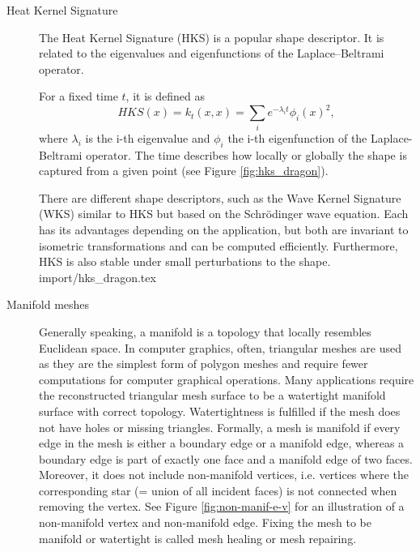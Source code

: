 \documentclass[class=article, crop=false]{standalone}
\begin{document}
\begin{description}
    \item[Heat Kernel Signature] The Heat Kernel Signature (HKS) is a popular shape descriptor. It is related to the eigenvalues and eigenfunctions of the Laplace–Beltrami operator.
    
    For a fixed time $t$, it is defined as 
    \begin{equation}
        HKS(x) = k_t(x,x) = \sum_{i} e^{-\lambda_i t}\phi_i(x)^2,
    \end{equation}
    where $\lambda_i$ is the i-th eigenvalue and $\phi_i$ the i-th eigenfunction of the Laplace-Beltrami operator.
    The time describes how locally or globally the shape is captured from a given point (see Figure \ref{fig:hks_dragon}).
    
    There are different shape descriptors, such as the Wave Kernel Signature (WKS) similar to HKS but based on the Schrödinger wave equation. Each has its advantages depending on the application, but both are invariant to isometric transformations and can be computed efficiently.
    Furthermore, HKS is also stable under small perturbations to the shape.
    {import/hks_dragon.tex}
    
    \item[Manifold meshes] Generally speaking, a manifold is a topology that locally resembles Euclidean space. In computer graphics, often, triangular meshes are used as they are the simplest form of polygon meshes and require fewer computations for computer graphical operations. Many applications require the reconstructed triangular mesh surface to be a watertight manifold surface with correct topology. Watertightness is fulfilled if the mesh does not have holes or missing triangles. Formally, a mesh is manifold if every edge in the mesh is either a boundary edge or a manifold edge, whereas a boundary edge is part of exactly one face and a manifold edge of two faces. Moreover, it does not include non-manifold vertices, i.e. vertices where the corresponding star (= union of all incident faces) is not connected when removing the vertex. See Figure \ref{fig:non-manif-e-v} for an illustration of a non-manifold vertex and non-manifold edge.
    Fixing the mesh to be manifold or watertight is called mesh healing or mesh repairing.
    \end{description}
    
\end{document}
